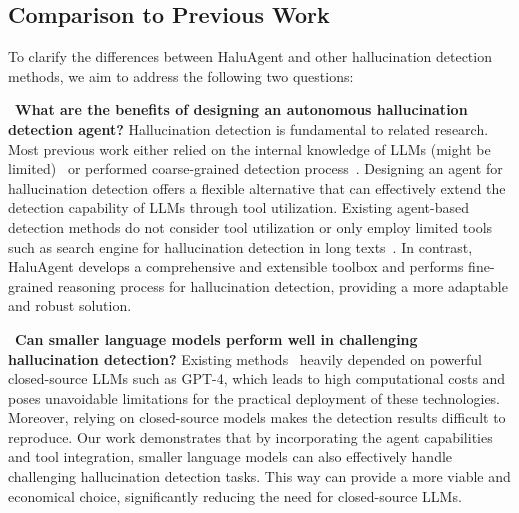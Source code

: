 \subsection{Comparison to Previous Work}

To clarify the differences between HaluAgent and other hallucination detection methods, we aim to address the following two questions:

\textbullet~\textbf{What are the benefits of designing an autonomous hallucination detection agent?} Hallucination detection is fundamental to related research. Most previous work either relied on the internal knowledge of LLMs (might be limited)~\cite{LMvsLM} or performed coarse-grained detection process~\cite{manakul2023selfcheckgpt}. Designing an agent for hallucination detection offers a flexible alternative that can effectively extend the detection capability of LLMs through tool utilization.
Existing agent-based detection methods do not consider tool utilization or only employ limited tools such as search engine for hallucination detection in long texts~\cite{lei2023chain,wei2024long}.
In contrast, HaluAgent develops a comprehensive and extensible toolbox and performs fine-grained reasoning process for hallucination detection, providing a more adaptable and robust solution.


\textbullet~\textbf{Can smaller language models perform well in challenging hallucination detection?}
Existing methods~\cite{chern2023factool, manakul2023selfcheckgpt, dhuliawala2023chain} heavily depended on powerful closed-source LLMs such as GPT-4, which leads to high computational costs and poses unavoidable limitations for the practical deployment of these technologies. Moreover, relying on closed-source models makes the detection results difficult to reproduce. 
Our work demonstrates that by incorporating the agent capabilities and tool integration, smaller language models can also effectively handle challenging hallucination detection tasks.
This way can provide a more viable and economical choice, significantly reducing the need for closed-source LLMs.


